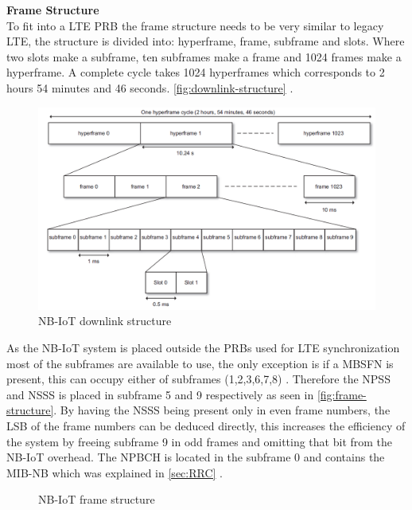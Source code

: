 \textbf{Frame Structure}\\

To fit into a \gls{LTE} \gls{PRB} the frame structure needs to be very similar to legacy \gls{LTE}, the structure is divided into: hyperframe, frame, subframe and slots. Where two slots make a subframe, ten subframes make a frame and 1024 frames make a hyperframe. A complete cycle takes 1024 hyperframes which corresponds to 2 hours 54 minutes and 46 seconds.  \autoref{fig:downlink-structure} \citep[ch. 7.2]{NB-IoT_Book}. 


\begin{figure}[H]
\centering
\includegraphics[width=\textwidth]{figures/downlink_structure_15kHz.png}
\caption{\gls{NB-IoT} downlink structure \citep[Fig. 7.7]{NB-IoT_Book}}
\label{fig:downlink-structure}
\end{figure}


As the \gls{NB-IoT} system is placed outside the \gls{PRB}s used for LTE synchronization most of the subframes are available to use, the only exception is if a \gls{MBSFN} is present, this can occupy either of subframes (1,2,3,6,7,8) \citep{LTE-MBSFN}. Therefore the \gls{NPSS} and \gls{NSSS} is placed in subframe 5 and 9 respectively as seen in \autoref{fig:frame-structure}. By having the \gls{NSSS} being present only in even frame numbers, the \gls{LSB} of the frame numbers can be deduced directly, this increases the efficiency of the system by freeing subframe 9 in odd frames and omitting that bit from the \gls{NB-IoT} overhead. The \gls{NPBCH} is located in the subframe 0 and contains the \gls{MIB-NB} which was explained in \autoref{sec:RRC} \citep{REL-13}.  

\begin{figure}[H]
\centering

\caption{\gls{NB-IoT} frame structure \citep{REL-13}}
\label{fig:frame-structure}
\end{figure}


